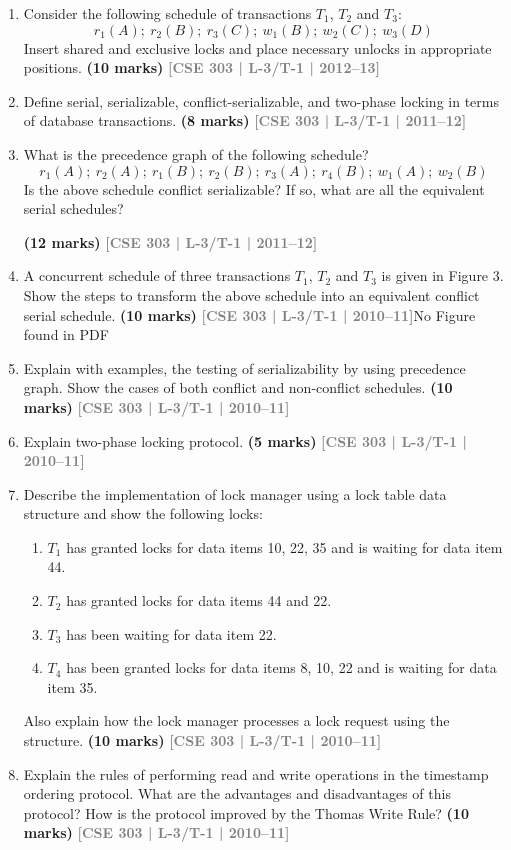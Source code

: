 \documentclass[12pt]{article}
\newcommand{\yr}[1]{\hfill\textcolor{gray}{\small\textbf{[#1]}}}
\newcommand{\mk}[1]{\textcolor{orange!70!black}{\small\textbf{(#1 marks)}}}
\begin{document}
\begin{enumerate}
\item Consider the following schedule of transactions $T_1$, $T_2$ and $T_3$:
\[r_1(A);\ r_2(B);\ r_3(C);\ w_1(B);\ w_2(C);\ w_3(D)\]
Insert shared and exclusive locks and place necessary unlocks in appropriate positions.
\mk{10} \yr{CSE 303 | L-3/T-1 | 2012--13}


\item Define serial, serializable, conflict-serializable, and two-phase locking in terms of database transactions.
\mk{8} \yr{CSE 303 | L-3/T-1 | 2011--12}


\item What is the precedence graph of the following schedule?
\[r_1(A);\ r_2(A);\ r_1(B);\ r_2(B);\ r_3(A);\ r_4(B);\ w_1(A);\ w_2(B)\]
Is the above schedule conflict serializable? If so, what are all the equivalent serial schedules?

\mk{12} \yr{CSE 303 | L-3/T-1 | 2011--12}


\item A concurrent schedule of three transactions $T_1$, $T_2$ and $T_3$ is given in Figure 3. Show the steps to transform the above schedule into an equivalent conflict serial schedule.
\mk{10} \yr{CSE 303 | L-3/T-1 | 2010--11}\textcolor{cG}{No Figure found in PDF }




\item Explain with examples, the testing of serializability by using precedence graph. Show the cases of both conflict and non-conflict schedules.
\mk{10} \yr{CSE 303 | L-3/T-1 | 2010--11}


\item Explain two-phase locking protocol.
\mk{5} \yr{CSE 303 | L-3/T-1 | 2010--11}


\item Describe the implementation of lock manager using a lock table data structure and show the following locks:
\begin{enumerate}
  \item $T_1$ has granted locks for data items 10, 22, 35 and is waiting for data item 44.
  \item $T_2$ has granted locks for data items 44 and 22.
  \item $T_3$ has been waiting for data item 22.
  \item $T_4$ has been granted locks for data items 8, 10, 22 and is waiting for data item 35.
\end{enumerate}
Also explain how the lock manager processes a lock request using the structure.
\mk{10} \yr{CSE 303 | L-3/T-1 | 2010--11}


\item Explain the rules of performing read and write operations in the timestamp ordering protocol. What are the advantages and disadvantages of this protocol? How is the protocol improved by the Thomas Write Rule?
\mk{10} \yr{CSE 303 | L-3/T-1 | 2010--11}


\end{enumerate}
\end{document}
